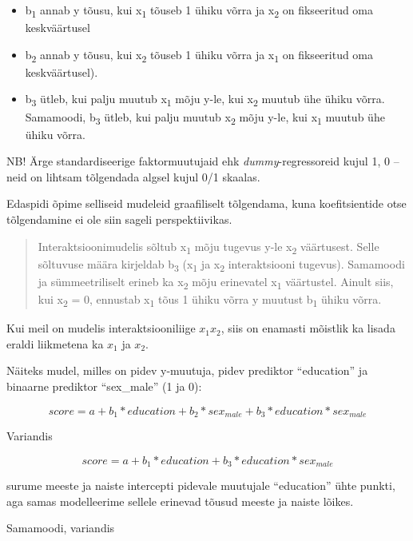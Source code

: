 \documentclass[]{book}
\begin{document}
\begin{itemize}
\item
  b\textsubscript{1} annab y tõusu, kui x\textsubscript{1} tõuseb 1 ühiku võrra ja x\textsubscript{2} on fikseeritud oma keskväärtusel
\item
  b\textsubscript{2} annab y tõusu, kui x\textsubscript{2} tõuseb 1 ühiku võrra ja x\textsubscript{1} on fikseeritud oma keskväärtusel).
\item
  b\textsubscript{3} ütleb, kui palju muutub x\textsubscript{1} mõju y-le, kui x\textsubscript{2} muutub ühe ühiku võrra. Samamoodi, b\textsubscript{3} ütleb, kui palju muutub x\textsubscript{2} mõju y-le, kui x\textsubscript{1} muutub ühe ühiku võrra.
\end{itemize}

NB! Ärge standardiseerige faktormuutujaid ehk \emph{dummy}-regressoreid kujul 1, 0 -- neid on lihtsam tõlgendada algsel kujul 0/1 skaalas.

Edaspidi õpime selliseid mudeleid graafiliselt tõlgendama, kuna koefitsientide otse tõlgendamine ei ole siin sageli perspektiivikas.

\begin{quote}
Interaktsioonimudelis sõltub x\textsubscript{1} mõju tugevus y-le x\textsubscript{2} väärtusest. Selle sõltuvuse määra kirjeldab b\textsubscript{3} (x\textsubscript{1} ja x\textsubscript{2} interaktsiooni tugevus). Samamoodi ja sümmeetriliselt erineb ka x\textsubscript{2} mõju erinevatel x\textsubscript{1} väärtustel. Ainult siis, kui x\textsubscript{2} = 0, ennustab x\textsubscript{1} tõus 1 ühiku võrra y muutust b\textsubscript{1} ühiku võrra.
\end{quote}

Kui meil on mudelis interaktsiooniliige \(x_1x_2\), siis on enamasti mõistlik ka lisada eraldi liikmetena ka \(x_1\) ja \(x_2\).

Näiteks mudel, milles on pidev y-muutuja, pidev prediktor ``education'' ja binaarne prediktor ``sex\_male'' (1 ja 0):

\[score = a + b_1 * education + b_2 * sex_{male} + b_3 * education * sex_{male}\]

Variandis

\[score = a + b_1 * education + b_3 * education * sex_{male}\]

surume meeste ja naiste intercepti pidevale muutujale ``education'' ühte punkti, aga samas modelleerime sellele erinevad tõusud meeste ja naiste lõikes.

Samamoodi, variandis
\end{document}
